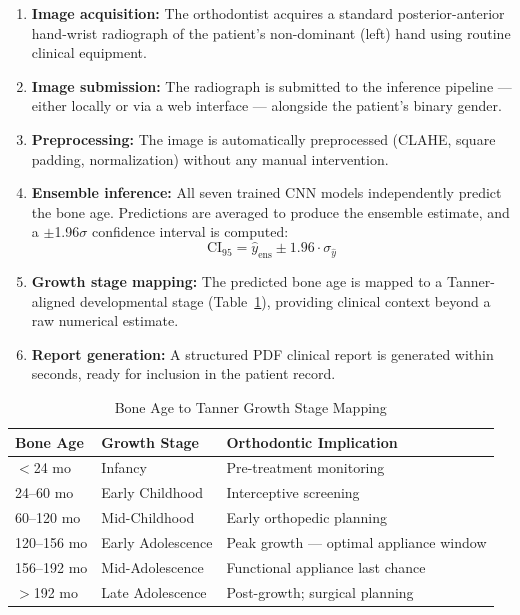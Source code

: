 \documentclass[conference]{IEEEtran}
\begin{document}
\begin{enumerate}
  \item \textbf{Image acquisition:} The orthodontist acquires a
        standard posterior-anterior hand-wrist radiograph of the
        patient's non-dominant (left) hand using routine clinical
        equipment.
  \item \textbf{Image submission:} The radiograph is submitted to
        the inference pipeline — either locally or via a web
        interface — alongside the patient's binary gender.
  \item \textbf{Preprocessing:} The image is automatically
        preprocessed (CLAHE, square padding, normalization) without
        any manual intervention.
  \item \textbf{Ensemble inference:} All seven trained CNN models
        independently predict the bone age. Predictions are averaged
        to produce the ensemble estimate, and a $\pm$1.96$\sigma$
        confidence interval is computed:
        \[
          \text{CI}_{95} = \hat{y}_{\text{ens}} \pm 1.96 \cdot \sigma_{\hat{y}}
        \]
  \item \textbf{Growth stage mapping:} The predicted bone age is
        mapped to a Tanner-aligned developmental stage
        (Table~\ref{tab:tanner}), providing clinical context beyond
        a raw numerical estimate.
  \item \textbf{Report generation:} A structured PDF clinical
        report is generated within seconds, ready for inclusion in
        the patient record.
\end{enumerate}

\begin{table}[H]
\centering
\caption{Bone Age to Tanner Growth Stage Mapping}
\label{tab:tanner}
\renewcommand{\arraystretch}{1.2}
\begin{tabular}{lll}
\toprule
\textbf{Bone Age} & \textbf{Growth Stage} & \textbf{Orthodontic Implication} \\
\midrule
$<$24 mo   & Infancy          & Pre-treatment monitoring \\
24--60 mo  & Early Childhood  & Interceptive screening \\
60--120 mo & Mid-Childhood    & Early orthopedic planning \\
120--156 mo & Early Adolescence & Peak growth — optimal appliance window \\
156--192 mo & Mid-Adolescence  & Functional appliance last chance \\
$>$192 mo  & Late Adolescence & Post-growth; surgical planning \\
\bottomrule
\end{tabular}
\end{table}
\end{document}
